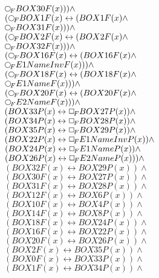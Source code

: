 \documentclass[a4paper,10pt]{article}
\begin{document}
 $  \Rnext BOX30F(x))) \land $ \\ 
 $ ( \Rnext BOX1F(x) \leftrightarrow (BOX1F(x) \land $ \\ 
 $  \Rnext BOX31F(x))) \land $ \\ 
 $ ( \Rnext BOX2F(x) \leftrightarrow (BOX2F(x) \land $ \\ 
 $  \Rnext BOX32F(x))) \land $ \\ 
 $ ( \Rnext BOX16F(x) \leftrightarrow (BOX16F(x) \land $ \\ 
 $  \Rnext E1NameInvF(x))) \land $ \\ 
 $ ( \Rnext BOX18F(x) \leftrightarrow (BOX18F(x) \land $ \\ 
 $  \Rnext E1NameF(x))) \land $ \\ 
 $ ( \Rnext BOX20F(x) \leftrightarrow (BOX20F(x) \land $ \\ 
 $  \Rnext E2NameF(x))) \land $ \\ 
 $ (BOX33P(x) \leftrightarrow  \Box_{\!F} BOX27P(x)) \land $ \\ 
 $ (BOX34P(x) \leftrightarrow  \Box_{\!F} BOX28P(x)) \land $ \\ 
 $ (BOX35P(x) \leftrightarrow  \Box_{\!F} BOX29P(x)) \land $ \\ 
 $ (BOX22P(x) \leftrightarrow  \Box_{\!F} E1NameInvP(x)) \land $ \\ 
 $ (BOX24P(x) \leftrightarrow  \Box_{\!F} E1NameP(x)) \land $ \\ 
 $ (BOX26P(x) \leftrightarrow  \Box_{\!F} E2NameP(x))) \land $ \\ 
 $ (BOX32F(x) \leftrightarrow BOX29P(x)) \land $ \\ 
 $ (BOX30F(x) \leftrightarrow BOX27P(x)) \land $ \\ 
 $ (BOX31F(x) \leftrightarrow BOX28P(x)) \land $ \\ 
 $ (BOX12F(x) \leftrightarrow BOX6P(x)) \land $ \\ 
 $ (BOX10F(x) \leftrightarrow BOX4P(x)) \land $ \\ 
 $ (BOX14F(x) \leftrightarrow BOX8P(x)) \land $ \\ 
 $ (BOX18F(x) \leftrightarrow BOX24P(x)) \land $ \\ 
 $ (BOX16F(x) \leftrightarrow BOX22P(x)) \land $ \\ 
 $ (BOX20F(x) \leftrightarrow BOX26P(x)) \land $ \\ 
 $ (BOX2F(x) \leftrightarrow BOX35P(x)) \land $ \\ 
 $ (BOX0F(x) \leftrightarrow BOX33P(x)) \land $ \\ 
 $ (BOX1F(x) \leftrightarrow BOX34P(x)) \land $ \\ 
\end{document}
